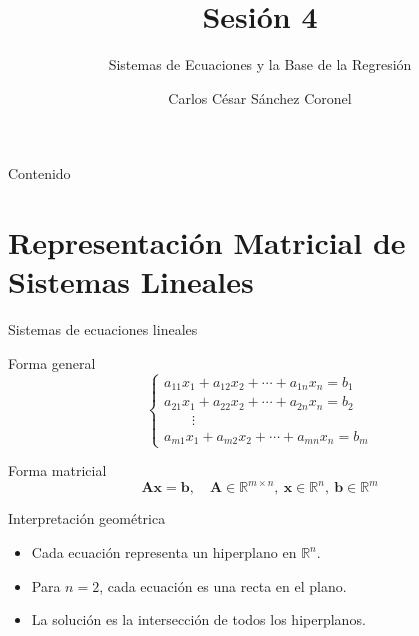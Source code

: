\documentclass[aspectratio=169, 10pt, xcolor=table]{beamer}
\title[SESI\'ON 4 CÁLCULO]{\textbf{Sesi\'on 4}}
\subtitle{Sistemas de Ecuaciones y la Base de la Regresión}
\author[Prof. C. S\'anchez]{Carlos C\'esar S\'anchez Coronel}
\institute{\textbf{CÁLCULO Y ÁLGEBRA LINEAL PARA IA}}
\date{}
\begin{document}
\begin{frame}
    \titlepage
\end{frame}

\begin{frame}{Contenido}
    \tableofcontents
\end{frame}

\section{Representación Matricial de Sistemas Lineales}

\begin{frame}{Sistemas de ecuaciones lineales}
    \begin{block}{Forma general}
        \[
        \begin{cases}
            a_{11}x_1 + a_{12}x_2 + \cdots + a_{1n}x_n = b_1 \\
            a_{21}x_1 + a_{22}x_2 + \cdots + a_{2n}x_n = b_2 \\
            \qquad \vdots \\
            a_{m1}x_1 + a_{m2}x_2 + \cdots + a_{mn}x_n = b_m
        \end{cases}
        \]
    \end{block}
    \begin{block}{Forma matricial}
        \[
        \mathbf{A}\mathbf{x} = \mathbf{b},\quad \mathbf{A}\in\mathbb{R}^{m\times n},\ \mathbf{x}\in\mathbb{R}^n,\ \mathbf{b}\in\mathbb{R}^m
        \]
    \end{block}
\end{frame}

\begin{frame}{Interpretación geométrica}
    \begin{itemize}
        \item Cada ecuación representa un hiperplano en $\mathbb{R}^n$.
        \item Para $n=2$, cada ecuación es una recta en el plano.
        \item La solución es la intersección de todos los hiperplanos.
    \end{itemize}
    \centering
\end{frame}
\end{document}
